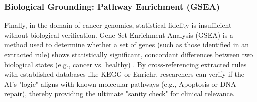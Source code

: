\subsubsection{Biological Grounding: Pathway Enrichment (GSEA)}
Finally, in the domain of cancer genomics, statistical fidelity is insufficient without biological verification. 
Gene Set Enrichment Analysis (GSEA) is a method used to determine whether a set of genes (such as those 
identified in an extracted rule) shows statistically significant, concordant differences between two biological 
states (e.g., cancer vs. healthy) \cite{Subramanian2005}. By cross-referencing extracted rules with 
established databases like KEGG or Enrichr, researchers can verify if the AI’s "logic" aligns with known 
molecular pathways (e.g., Apoptosis or DNA repair), thereby providing the ultimate "sanity check" for clinical 
relevance.
